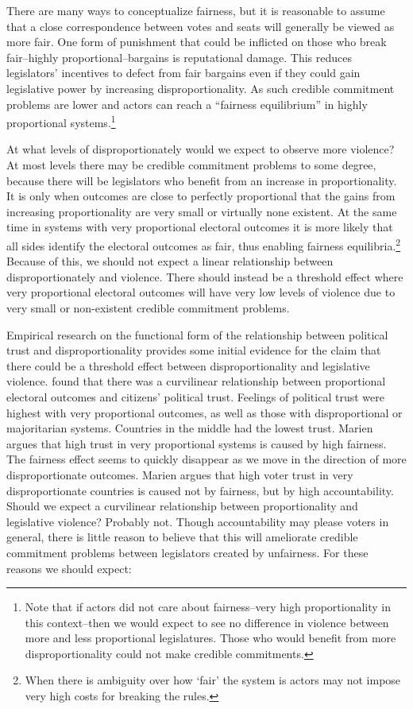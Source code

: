 \documentclass[a4paper]{article}\usepackage[]{graphicx}\usepackage[]{color}
\begin{document}
There are many ways to conceptualize fairness, but it is reasonable to assume that a close correspondence between votes and seats will generally be viewed as more fair. One form of punishment that could be inflicted on those who break fair--highly proportional--bargains is reputational damage. This reduces legislators' incentives to defect from fair bargains even if they could gain legislative power by increasing disproportionality. As such credible commitment problems are lower and actors can reach a ``fairness equilibrium'' in highly proportional systems.\footnote{Note that if actors did not care about fairness--very high proportionality in this context--then we would expect to see no difference in violence between more and less proportional legislatures. Those who would benefit from more disproportionality could not make credible commitments.}

At what levels of disproportionately would we expect to observe more violence? At most levels there may be credible commitment problems to some degree, because there will be legislators who benefit from an increase in proportionality. It is only when outcomes are close to perfectly proportional that the gains from increasing proportionality are very small or virtually none existent. At the same time in systems with very proportional electoral outcomes it is more likely that all sides identify the electoral outcomes as fair, thus enabling fairness equilibria.\footnote{When there is ambiguity over how `fair' the system is actors may not impose very high costs for breaking the rules.} Because of this, we should not expect a linear relationship between disproportionately and violence. There should instead be a threshold effect where very proportional electoral outcomes will have very low levels of violence due to very small or non-existent credible commitment problems.

Empirical research on the functional form of the relationship between political trust and disproportionality provides some initial evidence for the claim that there could be a threshold effect between disproportionality and legislative violence. \cite{Marien2011} found that there was a curvilinear relationship between proportional electoral outcomes and citizens' political trust. Feelings of political trust were highest with very proportional outcomes, as well as those with disproportional or majoritarian systems. Countries in the middle had the lowest trust. Marien argues that high trust in very proportional systems is caused by high fairness. The fairness effect seems to quickly disappear as we move in the direction of more disproportionate outcomes. Marien argues that high voter trust in very disproportionate countries is caused not by fairness, but by high accountability. Should we expect a curvilinear relationship between proportionality and legislative violence? Probably not. Though accountability may please voters in general, there is little reason to believe that this will ameliorate credible commitment problems between legislators created by unfairness. For these reasons we should expect:
\end{document}
